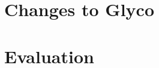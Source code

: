 \documentclass[main.tex]{subfiles}
\begin{document}
\section{Changes to Glyco} \label{sct:cls-changes}

\section{Evaluation} \label{sct:cls-eval}

\onlyinsubfile{\glsaddall\printglossaries}
\end{document}
